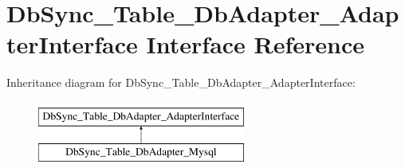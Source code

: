 \hypertarget{interfaceDbSync__Table__DbAdapter__AdapterInterface}{
\section{DbSync\_\-Table\_\-DbAdapter\_\-AdapterInterface Interface Reference}
\label{interfaceDbSync__Table__DbAdapter__AdapterInterface}
}
Inheritance diagram for DbSync\_\-Table\_\-DbAdapter\_\-AdapterInterface:\begin{figure}[H]
\begin{center}
\leavevmode
\includegraphics[height=2.000000cm]{interfaceDbSync__Table__DbAdapter__AdapterInterface}
\end{center}
\end{figure}
